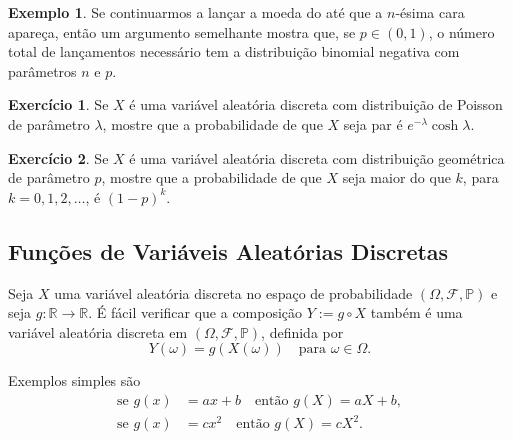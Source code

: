 \documentclass[12pt,portuguese]{article}
\theoremstyle{definition}
\newtheorem{example}[example]{Exemplo}
\newtheorem{exercise}{Exercício}
\begin{document}
\begin{example}\label{ex:binomial-negativa-n-esima-cara}
  Se continuarmos a lançar a moeda do  até que a
  \(n\)-ésima cara apareça, então um argumento semelhante mostra que, se
  \(p \in (0, 1)\), o número total de lançamentos necessário tem a
  distribuição binomial negativa com parâmetros \(n\) e \(p\).
\end{example}

\begin{exercise}\label{exercise:poisson-par}
  Se \(X\) é uma variável aleatória discreta com distribuição de Poisson de
  parâmetro \(\lambda\), mostre que a probabilidade de que \(X\) seja par é
  \(e^{-\lambda} \cosh \lambda\).
\end{exercise}

\begin{exercise}\label{exercise:geometrica-cauda}
  Se \(X\) é uma variável aleatória discreta com distribuição geométrica de
  parâmetro \(p\), mostre que a probabilidade de que \(X\) seja maior do que
  \(k\), para \(k=0,1,2,\dots\), é \((1-p)^k\).
\end{exercise}
\subsection{Funções de Variáveis Aleatórias Discretas}
\label{sec:funcoes-de-va}

Seja \(X\) uma variável aleatória discreta no espaço de probabilidade
\((\Omega, \mathcal{F}, \mathbb{P})\) e seja \(g : \mathbb{R} \to \mathbb{R}\).
É fácil verificar que a composição \(Y := g\circ X\) também é uma variável
aleatória discreta em \((\Omega, \mathcal{F}, \mathbb{P})\), definida por
\[
  Y(\omega) = g(X(\omega)) \quad \text{para } \omega \in \Omega.
\]

Exemplos simples são
\[
  \begin{aligned}
    \text{se } g(x) &= ax + b \quad \text{então } g(X) = aX + b, \\
    \text{se } g(x) &= cx^2 \quad \text{então } g(X) = cX^2.
  \end{aligned}
\]
\end{document}
